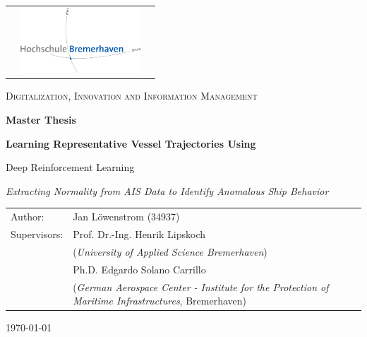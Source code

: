 \begin{titlepage}
\begin{tabular}{lcr}
  \hspace{10cm} &
  \includegraphics[width=170px]{images/hb_logo_2c.jpg}
  \vspace{1cm}
\end{tabular}
	\centering	
	\vspace{0cm}
	{\scshape\Large Digitalization, Innovation and Information Management \par}
	\vspace{1.5cm}
	{\Large\bfseries Master Thesis\par}
	\centering
    \vspace{2cm}
    {\Large\bfseries 
      Learning Representative Vessel Trajectories       Using  \par Deep Reinforcement Learning   \par
}
       {\normalsize\itshape
  Extracting Normality from AIS Data to Identify Anomalous Ship Behavior
      \par}
	\vfill
	\vspace{2cm}
	\begin{tabularx}{\textwidth}{lX}
		Author: & Jan Löwenstrom (34937)\\
		Supervisors: & Prof. Dr.-Ing. Henrik Lipskoch \\ &(\textit{University of Applied Science Bremerhaven}) \\
		& Ph.D. Edgardo Solano Carrillo \\&(\textit{German Aerospace Center - Institute for the Protection of Maritime Infrastructures}, Bremerhaven)
		        
	\end{tabularx}  
    \vfill

	{\large \today \par}       
\end{titlepage}
\restoregeometry